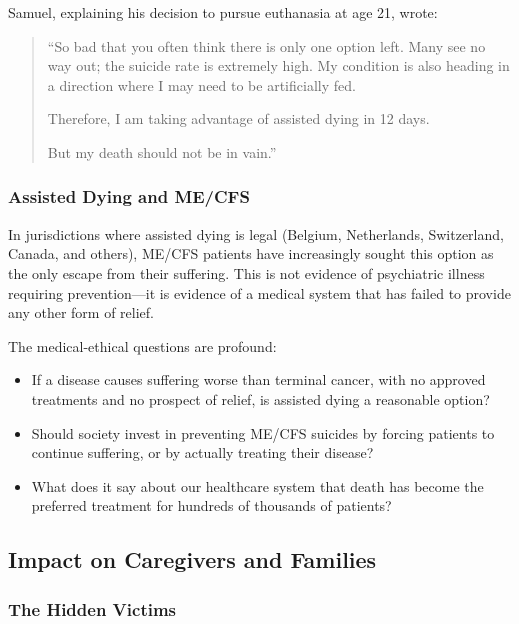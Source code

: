 Samuel, explaining his decision to pursue euthanasia at age 21, wrote:

\begin{quote}
``So bad that you often think there is only one option left. Many see no way out; the suicide rate is extremely high. My condition is also heading in a direction where I may need to be artificially fed.

Therefore, I am taking advantage of assisted dying in 12 days.

But my death should not be in vain.''
\end{quote}

\subsubsection{Assisted Dying and ME/CFS}
\label{subsec:assisted-dying}

In jurisdictions where assisted dying is legal (Belgium, Netherlands, Switzerland, Canada, and others), ME/CFS patients have increasingly sought this option as the only escape from their suffering. This is not evidence of psychiatric illness requiring prevention---it is evidence of a medical system that has failed to provide any other form of relief.

The medical-ethical questions are profound:
\begin{itemize}
    \item If a disease causes suffering worse than terminal cancer, with no approved treatments and no prospect of relief, is assisted dying a reasonable option?
    \item Should society invest in preventing ME/CFS suicides by forcing patients to continue suffering, or by actually treating their disease?
    \item What does it say about our healthcare system that death has become the preferred treatment for hundreds of thousands of patients?
\end{itemize}

\subsection{Impact on Caregivers and Families}
\label{sec:impact-others}

\subsubsection{The Hidden Victims}
\label{subsec:caregiver-burden}

